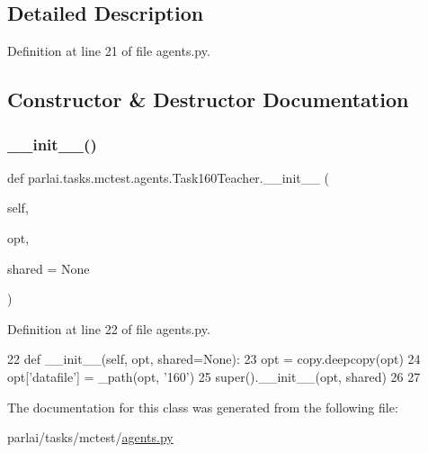 \subsection{Detailed Description}


Definition at line 21 of file agents.\+py.



\subsection{Constructor \& Destructor Documentation}
\mbox{\label{classparlai_1_1tasks_1_1mctest_1_1agents_1_1Task160Teacher_ada45ef335bc03d8fa3a410b4e9b6b282}} 
\subsubsection{\texorpdfstring{\+\_\+\+\_\+init\+\_\+\+\_\+()}{\_\_init\_\_()}}
{\footnotesize\ttfamily def parlai.\+tasks.\+mctest.\+agents.\+Task160\+Teacher.\+\_\+\+\_\+init\+\_\+\+\_\+ (\begin{DoxyParamCaption}\item[{}]{self,  }\item[{}]{opt,  }\item[{}]{shared = {\ttfamily None} }\end{DoxyParamCaption})}



Definition at line 22 of file agents.\+py.


\begin{DoxyCode}
22     \textcolor{keyword}{def }\_\_init\_\_(self, opt, shared=None):
23         opt = copy.deepcopy(opt)
24         opt[\textcolor{stringliteral}{'datafile'}] = \_path(opt, \textcolor{stringliteral}{'160'})
25         super().\_\_init\_\_(opt, shared)
26 
27 
\end{DoxyCode}


The documentation for this class was generated from the following file\+:\begin{DoxyCompactItemize}
\item 
parlai/tasks/mctest/\hyperlink{parlai_2tasks_2mctest_2agents_8py}{agents.\+py}\end{DoxyCompactItemize}
